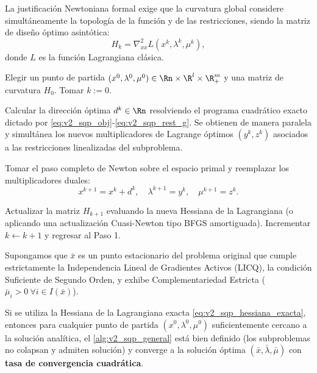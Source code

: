 La justificación Newtoniana formal exige que la curvatura global considere simultáneamente la topología de la función y de las restricciones, siendo la matriz de diseño óptimo asintótica:
\begin{equation}
    H_k = \nabla_{xx}^2 L(x^k, \lambda^k, \mu^k),
    \label{eq:v2_sqp_hessiana_exacta}
\end{equation}
donde $L$ es la función Lagrangiana clásica.

\begin{algorithm}\label{alg:v2_sqp_general}
    Elegir un punto de partida $(x^0, \lambda^0, \mu^0) \in \Rn \times \R^l \times \R_+^m$ y una matriz de curvatura $H_0$. Tomar $k := 0$.
    \begin{enuthm}
        \item Calcular la dirección óptima $d^k \in \Rn$ resolviendo el programa cuadrático exacto dictado por \eqref{eq:v2_sqp_obj}-\eqref{eq:v2_sqp_rest_g}. Se obtienen de manera paralela y simultánea los nuevos multiplicadores de Lagrange óptimos $(y^k, z^k)$ asociados a las restricciones linealizadas del subproblema.
        \item Tomar el paso completo de Newton sobre el espacio primal y reemplazar los multiplicadores duales:
        \[
            x^{k+1} = x^k + d^k, \quad \lambda^{k+1} = y^k, \quad \mu^{k+1} = z^k.
        \]
        \item Actualizar la matriz $H_{k+1}$ evaluando la nueva Hessiana de la Lagrangiana (o aplicando una actualización Cuasi-Newton tipo BFGS amortiguada). Incrementar $k \leftarrow k + 1$ y regresar al Paso 1.
    \end{enuthm}
\end{algorithm}

\begin{theorem}\label{thm:v2_sqp_local}
    Supongamos que $\bar{x}$ es un punto estacionario del problema original que cumple estrictamente la Independencia Lineal de Gradientes Activos (LICQ), la condición Suficiente de Segundo Orden, y exhibe Complementariedad Estricta ($\bar{\mu}_i > 0 \ \forall i \in I(\bar{x})$).
    
    Si se utiliza la Hessiana de la Lagrangiana exacta \eqref{eq:v2_sqp_hessiana_exacta}, entonces para cualquier punto de partida $(x^0, \lambda^0, \mu^0)$ suficientemente cercano a la solución analítica, el \cref{alg:v2_sqp_general} está bien definido (los subproblemas no colapsan y admiten solución) y converge a la solución óptima $(\bar{x}, \bar{\lambda}, \bar{\mu})$ con \textbf{tasa de convergencia cuadrática}.
\end{theorem}

